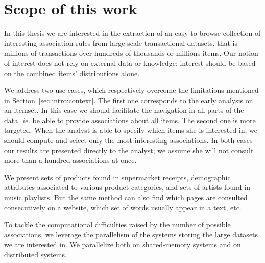 %
%





\section{Scope of this work}

In this thesis we are interested in the extraction of an easy-to-browse collection of interesting association rules
from large-scale transactional datasets,
that is millions of transactions over hundreds of thousands or millions items.
Our notion of interest does not rely on external data or knowledge:
interest should be based on the combined items' distributions alone.

We address two use cases,
which respectively overcome the limitations mentioned in Section~\ref{sec:intro:context}.
The first one corresponds to the early analysis on an itemset.
In this case we should facilitate the navigation in all parts of the data,
{\em ie.} be able to provide associations about all items.
The second one is more targeted.
When the analyst is able to specify which items she is interested in,
we should compute and select only the most interesting associations.
In both cases our results are presented directly to the analyst;
we assume she will not consult more than a hundred associations at once.

We present sets of products found in supermarket receipts,
demographic attributes associated to various product categories,
and sets of artists found in music playlists.
But the same method can also find which pages are consulted consecutively on a website,
which set of words usually appear in a text, etc.

To tackle the computational difficulties raised by the number of possible associations,
we leverage the parallelism of the systems storing the large datasets we are interested in.
We parallelize both on shared-memory systems and on distributed systems.



